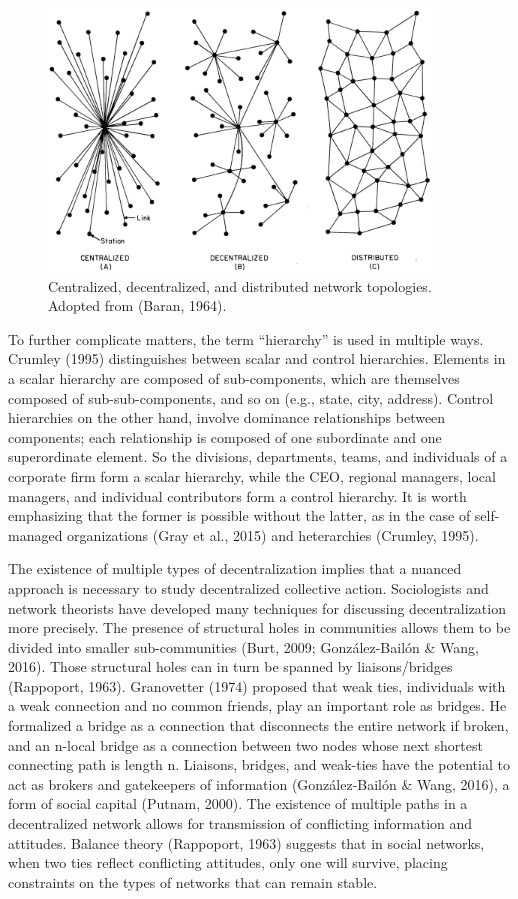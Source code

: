 \begin{figure}
\centering
\includegraphics[width=4in]{images/fig-decentralized.png}
\caption{
Centralized, decentralized, and distributed network topologies. Adopted from (Baran, 1964).
\label{fig:decentralization}
}
\end{figure}


To further complicate matters, the term ``hierarchy'' is used in multiple ways. Crumley (1995) distinguishes between scalar and control hierarchies. Elements in a scalar hierarchy are composed of sub-components, which are themselves composed of sub-sub-components, and so on (e.g., state, city, address). Control hierarchies on the other hand, involve dominance relationships between components; each relationship is composed of one subordinate and one superordinate element. So the divisions, departments, teams, and individuals of a corporate firm form a scalar hierarchy, while the CEO, regional managers, local managers, and individual contributors form a control hierarchy. It is worth emphasizing that the former is possible without the latter, as in the case of self-managed organizations (Gray et al., 2015) and heterarchies (Crumley, 1995).

The existence of multiple types of decentralization implies that a nuanced approach is necessary to study decentralized collective action. Sociologists and network theorists have developed many techniques for discussing decentralization more precisely. The presence of structural holes in communities allows them to be divided into smaller sub-communities (Burt, 2009; Gonz\'alez-Bail\'on \& Wang, 2016). Those structural holes can in turn be spanned by liaisons/bridges (Rappoport, 1963). Granovetter (1974) proposed that weak ties, individuals with a weak connection and no common friends, play an important role as bridges. He formalized a bridge as a connection that disconnects the entire network if broken, and an n-local bridge as a connection between two nodes whose next shortest connecting path is length n. Liaisons, bridges, and weak-ties have the potential to act as brokers and gatekeepers of information (Gonz\'alez-Bail\'on \& Wang, 2016), a form of social capital (Putnam, 2000). The existence of multiple paths in a decentralized network allows for transmission of conflicting information and attitudes. Balance theory (Rappoport, 1963) suggests that in social networks, when two ties reflect conflicting attitudes, only one will survive, placing constraints on the types of networks that can remain stable.

